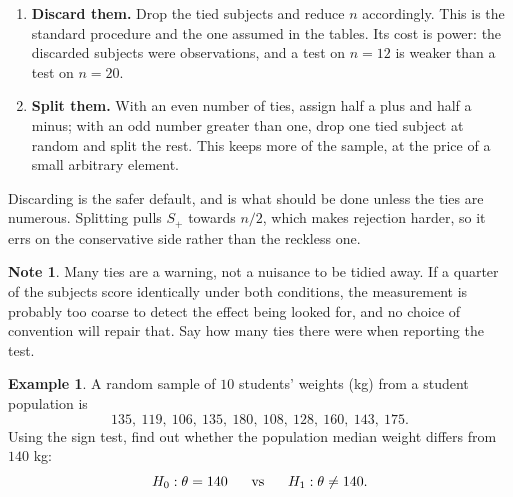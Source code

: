 \documentclass[11pt,a4paper]{article}
\theoremstyle{definition}
\newtheorem{example}[thm]{Example}
\newtheorem{note}[thm]{Note}
\begin{document}
\begin{enumerate}
\item[(i).] \textbf{Discard them.} Drop the tied subjects and reduce $n$
accordingly. This is the standard procedure and the one assumed in the tables.
Its cost is power: the discarded subjects were observations, and a test on $n=12$
is weaker than a test on $n=20$.
\item[(ii).] \textbf{Split them.} With an even number of ties, assign half a plus
and half a minus; with an odd number greater than one, drop one tied subject at
random and split the rest. This keeps more of the sample, at the price of a small
arbitrary element.
\end{enumerate}

Discarding is the safer default, and is what should be done unless the ties are
numerous. Splitting pulls $S_+$ towards $n/2$, which makes rejection harder, so it
errs on the conservative side rather than the reckless one.

\begin{note}
Many ties are a warning, not a nuisance to be tidied away. If a quarter of the
subjects score identically under both conditions, the measurement is probably too
coarse to detect the effect being looked for, and no choice of convention will
repair that. Say how many ties there were when reporting the test.
\end{note}









\begin{example}
A random sample of $10$ students' weights (kg) from a student population is
$$135,\ 119,\ 106,\ 135,\ 180,\ 108,\ 128,\ 160,\ 143,\ 175 .$$
Using the sign test, find out whether the population median weight differs from
$140$ kg:
$$H_0:\theta=140\hspace{0.6cm}\text{vs}\hspace{0.6cm}H_1:\theta\neq 140 .$$
\end{example}
\end{document}
